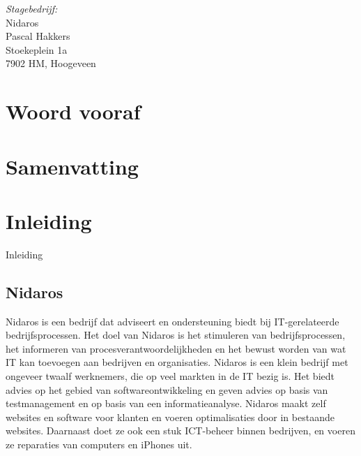 \documentclass[a4paper,11pt,oneside]{report}
\begin{document}
\emph{Stagebedrijf:}\\
  Nidaros\\
	Pascal Hakkers\\
	Stoekeplein 1a\\
	7902 HM, Hoogeveen



\chapter*{Woord vooraf}
\lipsum[1]

\chapter*{Samenvatting}
\lipsum[1]





\newpage
\renewcommand*\contentsname{Inhoud}
\tableofcontents
\cleardoublepage 
{}





\chapter{Inleiding} 
Inleiding


\section{Nidaros} 
Nidaros is een bedrijf dat adviseert en ondersteuning biedt bij IT-gerelateerde bedrijfsprocessen. Het doel van Nidaros is het stimuleren van bedrijfsprocessen, het informeren van procesverantwoordelijkheden en het bewust worden van wat IT kan toevoegen aan bedrijven en organisaties. Nidaros is een klein bedrijf met ongeveer twaalf werknemers, die op veel markten in de IT bezig is. Het biedt advies op het gebied van softwareontwikkeling en geven advies op basis van testmanagement en op basis van een informatieanalyse. Nidaros maakt zelf websites en software voor klanten en voeren optimalisaties door in bestaande websites. Daarnaast doet ze ook een stuk ICT-beheer binnen bedrijven, en voeren ze reparaties van computers en iPhones uit. 
\end{document}
